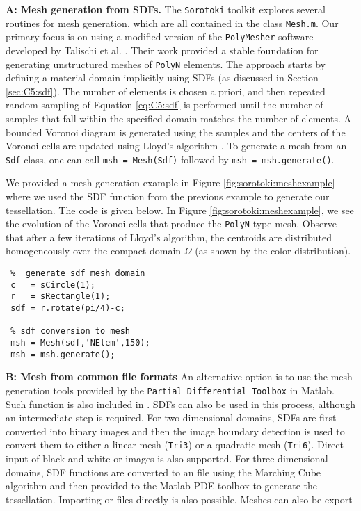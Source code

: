 \textbf{A: Mesh generation from SDFs.} The \texttt{Sorotoki} toolkit explores several routines for mesh generation, which are all contained in the class \texttt{Mesh.m}. Our primary focus is on using a modified version of the \texttt{PolyMesher} software developed by Talischi et al. \cite{Talischi2012Mar}. Their work provided a stable foundation for generating unstructured meshes of \texttt{PolyN} elements. The approach starts by defining a material domain implicitly using SDFs (as discussed in Section \ref{sec:C5:sdf}). The number of elements is chosen a priori, and then repeated random sampling of Equation \eqref{eq:C5:sdf} is performed until the number of samples that fall within the specified domain matches the number of elements. A bounded Voronoi diagram is generated using the samples and the centers of the Voronoi cells are updated using Lloyd's algorithm \cite{Lloyd1982Mar}. To generate a mesh from an \texttt{Sdf} class, one can call \texttt{msh = Mesh(Sdf)} followed by \texttt{msh = msh.generate()}.  \vspace{2mm}

\begin{example}
We provided a mesh generation example in Figure \ref{fig:sorotoki:meshexample} where we used the SDF function from the previous example to generate our tessellation. The code is given below. In Figure \ref{fig:sorotoki:meshexample}, we see the evolution of the Voronoi cells that produce the \texttt{PolyN}-type mesh. Observe that after a few iterations of Lloyd's algorithm, the centroids are distributed homogeneously over the compact domain $\Omega$ (as shown by the color distribution).
%
\begin{lstlisting}[style=matlab] 
 %% EXAMPLE: Mesh class 
 %  generate sdf mesh domain 
 c   = sCircle(1);    
 r   = sRectangle(1);  
 sdf = r.rotate(pi/4)-c; 
    
 % sdf conversion to mesh 
 msh = Mesh(sdf,'NElem',150);
 msh = msh.generate();
\end{lstlisting}
%
\end{example}
%
\textbf{B: Mesh from common file formats} An alternative option is to use the mesh generation tools provided by the \texttt{Partial Differential Toolbox} in Matlab. Such function is also included in . SDFs can also be used in this process, although an intermediate step is required. For two-dimensional domains, SDFs are first converted into binary images and then the image boundary detection is used to convert them to either a linear mesh (\texttt{Tri3}) or a quadratic mesh (\texttt{Tri6}). Direct input of black-and-white  or  images is also supported. For three-dimensional domains, SDF functions are converted to an  file using the Marching Cube algorithm \cite{Lorensen1987Aug} and then provided to the Matlab PDE toolbox to generate the tessellation. Importing  or  files directly is also possible. Meshes can also be export